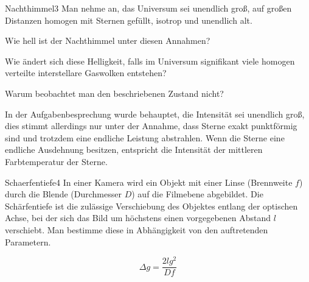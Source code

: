 

\begin{problem}{Nachthimmel}{3}
Man nehme an, das Universum sei unendlich groß, auf großen Distanzen homogen mit Sternen gefüllt, isotrop und unendlich alt.
\begin{abcenum}
\item Wie hell ist der Nachthimmel unter diesen Annahmen?
\item Wie ändert sich diese Helligkeit, falls im Universum signifikant viele homogen verteilte interstellare Gaswolken entstehen?
\item Warum beobachtet man den beschriebenen Zustand nicht?
\end{abcenum}
\begin{solution}
\begin{abcenum}
\item In der Aufgabenbesprechung wurde behauptet, die Intensität sei unendlich groß, dies stimmt allerdings nur unter der Annahme, dass Sterne exakt punktförmig sind und trotzdem eine endliche Leistung abstrahlen. Wenn die Sterne eine endliche Ausdehnung besitzen, entspricht die Intensität der mittleren Farbtemperatur der Sterne.
\end{abcenum}
\end{solution}
\end{problem}


\begin{problem}{Schaerfentiefe}{4}
In einer Kamera wird ein Objekt mit einer Linse (Brennweite $f$) durch die Blende (Durchmesser $D$) auf die Filmebene abgebildet. Die Schärfentiefe ist die zulässige Verschiebung des Objektes entlang der optischen Achse, bei der sich das Bild um höchstens einen vorgegebenen Abstand $l$ verschiebt. Man bestimme diese in Abhängigkeit von den auftretenden Parametern.

\begin{solution}
\[
\Delta g = \frac{2 l g^2}{D f}
\]
\end{solution}
\end{problem}


